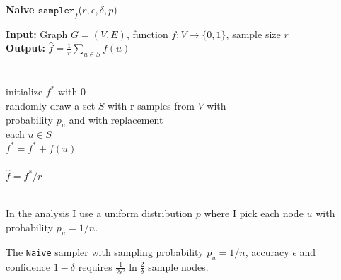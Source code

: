 \begin{algorithm*}[!htb]
  \caption{\small {\bf Naive $\texttt{sampler}_f$}($r, \epsilon, \delta, p$)}
  \begin{code}
  {\bf Input:} Graph $G=(V,E)$, function $f : V \rightarrow \{0,1\}$, sample size $r$ \\
  {\bf Output:} $\hat{f}=\frac{1}{r}\sum\nolimits_{u\in S} f(u)$\\
  \\
  \uln \>\ubegin\\
  \uln \>\>initialize $f^*$ with 0 \\
  \uln \>\>randomly draw a set $S$ with r samples from $V$ with\\
  \>\>\>\>probability $p_u$ and with replacement\\
  \uln \>\>\ufor each $u \in S$ \udo\\
  \uln \>\>\>$f^* = f^* + f(u)$ \\
  \uln \>\>\uend\\
  \uln \>\ureturn $\hat{f} = f^*/r$ \\
  \uln \>\uend\\ 
  \end{code}
  \label{algnaive}
\end{algorithm*}
In the analysis I use a uniform distribution $p$ where I pick each node $u$ with probability $p_u = 1/n$. 
\begin{theorem}
  The \texttt{Naive} sampler with sampling probability $p_u = 1/n$, accuracy $\epsilon$ and confidence $1-\delta$ requires $\frac{1}{2\epsilon^2}\ln{\frac{2}{\delta}}$ sample nodes.
\end{theorem}
